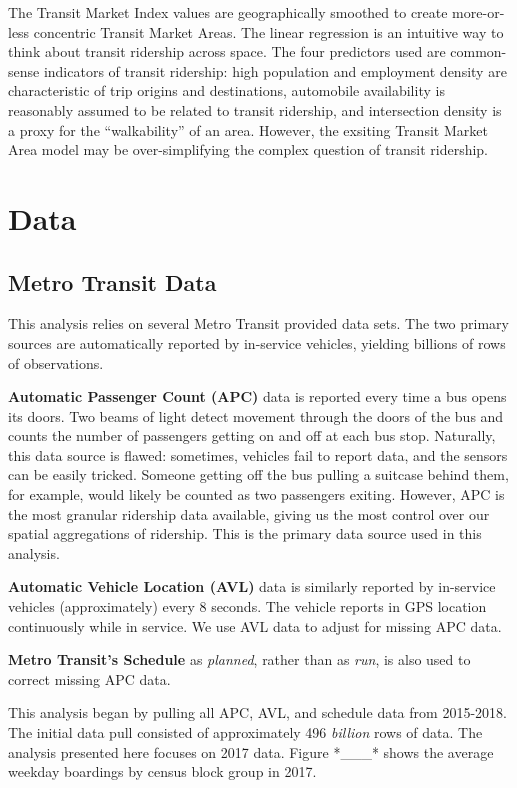 \documentclass[]{article}
\begin{document}
The Transit Market Index values are geographically smoothed to create
more-or-less concentric Transit Market Areas. The linear regression is
an intuitive way to think about transit ridership across space. The four
predictors used are common-sense indicators of transit ridership: high
population and employment density are characteristic of trip origins and
destinations, automobile availability is reasonably assumed to be
related to transit ridership, and intersection density is a proxy for
the ``walkability'' of an area. However, the exsiting Transit Market
Area model may be over-simplifying the complex question of transit
ridership.

\section{Data}\label{data}

\subsection{Metro Transit Data}\label{metro-transit-data}

This analysis relies on several Metro Transit provided data sets. The
two primary sources are automatically reported by in-service vehicles,
yielding billions of rows of observations.

\textbf{Automatic Passenger Count (APC)} data is reported every time a
bus opens its doors. Two beams of light detect movement through the
doors of the bus and counts the number of passengers getting on and off
at each bus stop. Naturally, this data source is flawed: sometimes,
vehicles fail to report data, and the sensors can be easily tricked.
Someone getting off the bus pulling a suitcase behind them, for example,
would likely be counted as two passengers exiting. However, APC is the
most granular ridership data available, giving us the most control over
our spatial aggregations of ridership. This is the primary data source
used in this analysis.

\textbf{Automatic Vehicle Location (AVL)} data is similarly reported by
in-service vehicles (approximately) every 8 seconds. The vehicle reports
in GPS location continuously while in service. We use AVL data to adjust
for missing APC data.

\textbf{Metro Transit's Schedule} as \emph{planned}, rather than as
\emph{run}, is also used to correct missing APC data.

This analysis began by pulling all APC, AVL, and schedule data from
2015-2018. The initial data pull consisted of approximately 496
\emph{billion} rows of data. The analysis presented here focuses on 2017
data. Figure *\_\_\_* shows the average weekday boardings by census
block group in 2017.
\end{document}
